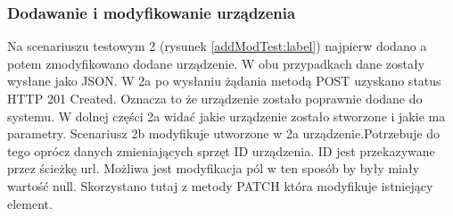 \subsubsection{Dodawanie i modyfikowanie urządzenia}
Na scenariuszu testowym 2 (rysunek \ref{addModTest:label}) najpierw dodano a potem zmodyfikowano dodane urządzenie. W obu przypadkach dane zostały wysłane jako JSON. W 2a po wysłaniu żądania metodą POST uzyskano status HTTP 201 Created. Oznacza to że urządzenie zostało poprawnie dodane do systemu. W dolnej części 2a widać jakie urządzenie zostało stworzone i jakie ma parametry. Scenariusz 2b modyfikuje utworzone w 2a urządzenie.Potrzebuje do tego oprócz danych zmieniających sprzęt ID urządzenia. ID jest przekazywane przez ścieżkę url. Możliwa jest modyfikacja pól w ten sposób by były miały wartość null. Skorzystano tutaj z metody PATCH która modyfikuje istniejący element.

